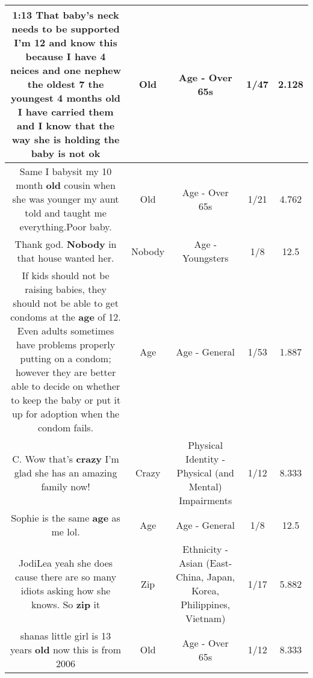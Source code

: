 \documentclass[11pt]{article}
\newlength\mylength
\begin{document}
\begin{center}
\begin{longtable}{|C{.65\mylength}|C{.30\mylength}|C{.12\mylength}|C{.12\mylength}|C{.12\mylength}|}
  \small 1:13 That baby's neck needs to be supported I'm 12 and know this because I have 4 neices and one nephew the oldest 7 the youngest 4 months \textbf{old} I have carried them and I know that the way she is holding the baby is not ok\normalsize   & Old & Age - Over 65s & 1/47 & 2.128 \\  \hline
  \small Same I babysit my 10 month \textbf{old} cousin when she was younger my aunt told and taught me everything.Poor baby.\normalsize   & Old & Age - Over 65s & 1/21 & 4.762 \\  \hline
  \small Thank god. \textbf{Nobody} in that house wanted her.\normalsize   & Nobody & Age - Youngsters & 1/8 & 12.5 \\  \hline
  \small If kids should not be raising babies, they should not be able to get condoms at the \textbf{age} of 12. Even adults sometimes have problems properly putting on a condom; however they are better able to decide on whether to keep the baby or put it up for adoption when the condom fails.\normalsize   & Age & Age - General & 1/53 & 1.887 \\  \hline
  \small C. Wow that's \textbf{crazy} I'm glad she has an amazing family now!\normalsize   & Crazy & Physical Identity - Physical (and Mental) Impairments & 1/12 & 8.333 \\  \hline
  \small Sophie is the same \textbf{age} as me lol.\normalsize   & Age & Age - General & 1/8 & 12.5 \\  \hline
  \small JodiLea yeah she does cause there are so many idiots asking how she knows. So \textbf{zip} it\normalsize   & Zip & Ethnicity - Asian (East- China, Japan, Korea, Philippines, Vietnam) & 1/17 & 5.882 \\  \hline
  \small shanas little girl is 13 years \textbf{old} now this is from 2006\normalsize   & Old & Age - Over 65s & 1/12 & 8.333 \\  \hline

\end{longtable}
\end{center}
\end{document}
